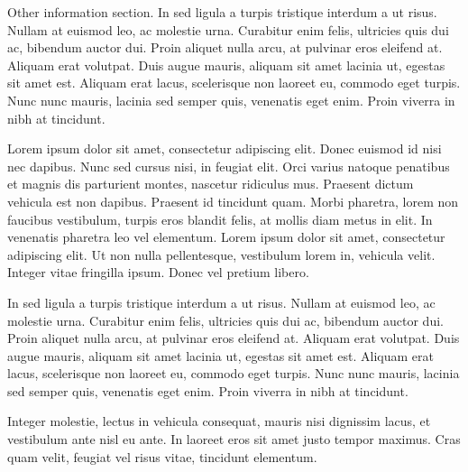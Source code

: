 \documentclass[letterpaper]{twentyonesecondcv} %
\begin{document}
{    Other information section. In sed ligula a turpis tristique interdum a ut risus. Nullam at euismod leo, ac molestie urna. Curabitur enim felis, ultricies quis dui ac, bibendum auctor dui. Proin aliquet nulla arcu, at pulvinar eros eleifend at. Aliquam erat volutpat. Duis augue mauris, aliquam sit amet lacinia ut, egestas sit amet est. Aliquam erat lacus, scelerisque non laoreet eu, commodo eget turpis. Nunc nunc mauris, lacinia sed semper quis, venenatis eget enim. Proin viverra in nibh at tincidunt.
    
    Lorem ipsum dolor sit amet, consectetur adipiscing elit. Donec euismod id nisi nec dapibus. Nunc sed cursus nisi, in feugiat elit. Orci varius natoque penatibus et magnis dis parturient montes, nascetur ridiculus mus. Praesent dictum vehicula est non dapibus. Praesent id tincidunt quam. Morbi pharetra, lorem non faucibus vestibulum, turpis eros blandit felis, at mollis diam metus in elit. In venenatis pharetra leo vel elementum. Lorem ipsum dolor sit amet, consectetur adipiscing elit. Ut non nulla pellentesque, vestibulum lorem in, vehicula velit. Integer vitae fringilla ipsum. Donec vel pretium libero.
    
    In sed ligula a turpis tristique interdum a ut risus. Nullam at euismod leo, ac molestie urna. Curabitur enim felis, ultricies quis dui ac, bibendum auctor dui. Proin aliquet nulla arcu, at pulvinar eros eleifend at. Aliquam erat volutpat. Duis augue mauris, aliquam sit amet lacinia ut, egestas sit amet est. Aliquam erat lacus, scelerisque non laoreet eu, commodo eget turpis. Nunc nunc mauris, lacinia sed semper quis, venenatis eget enim. Proin viverra in nibh at tincidunt.
    
    Integer molestie, lectus in vehicula consequat, mauris nisi dignissim lacus, et vestibulum ante nisl eu ante. In laoreet eros sit amet justo tempor maximus. Cras quam velit, feugiat vel risus vitae, tincidunt elementum.

}
\end{document}
